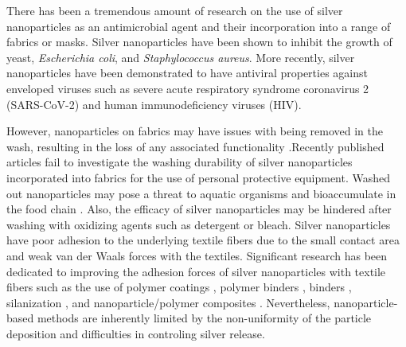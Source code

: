 \documentclass[journal=jacsat,manuscript=article]{achemso}
\begin{document}

There has been a tremendous amount of research on the use of silver nanoparticles as an antimicrobial agent \cite{lansdown:06,Rai:09}
 and their incorporation into 
a range of 
fabrics or masks.\cite{bu_fabrication_2019,perera_morphological_2013, lvm:10, zhong_plasmonic_2020,tremiliosi_ag_2020,abulikemu:2022} 
Silver nanoparticles have been shown to inhibit the growth of yeast, \textit{Escherichia coli}, and \textit{Staphylococcus aureus}. \cite{Kim:07mar} %
More recently, silver nanoparticles have been demonstrated to have antiviral properties against enveloped viruses such as severe acute respiratory syndrome coronavirus 2 (SARS-CoV-2) and human immunodeficiency viruses (HIV).\cite{jeremiah_potent_2020,lara_2010,elechiguerra_interaction_2005} %

However, nanoparticles on fabrics may have issues with being removed in the wash, resulting in the loss of any associated functionality \cite{Lorenz:12,Impellitteri:09}.Recently published articles fail to investigate the washing durability of silver nanoparticles incorporated into fabrics for the use of personal protective equipment.\cite{abulikemu:2022,zhong_plasmonic_2020}
Washed out nanoparticles 
may pose a threat to aquatic organisms \cite{Krysanov:10,Ma:13_nanoparticle,Fabrega:11,Pillai:14}
and bioaccumulate in the food chain \cite{Uddin:20}.
Also, the efficacy of silver nanoparticles may be hindered after washing with oxidizing agents such as detergent or bleach.\cite{lansdown:06,Impellitteri:09} 
Silver nanoparticles 
have poor adhesion to the underlying textile fibers due to the small contact area and weak van der Waals forces with the textiles.  Significant research has been dedicated to improving the adhesion forces of silver nanoparticles with textile fibers
such as the use of polymer coatings 
\cite{dastjerdi:2009}, 
polymer binders \cite{Zhang:13feb}, 
binders \cite{Zhou:18,abulikemu:2022}, silanization \cite{shen:2019}, and nanoparticle/polymer composites \cite{Zahran:14}.
Nevertheless, nanoparticle-based methods
are inherently limited by the non-uniformity of the particle deposition and difficulties in controling silver release.\cite{geranio:2009,mitrano:2014}
\end{document}
